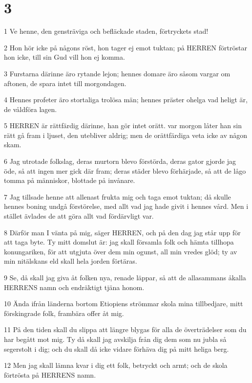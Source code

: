 \chapter{3}

\par 1 Ve henne, den gensträviga och befläckade staden, förtryckets stad!
\par 2 Hon hör icke på någons röst, hon tager ej emot tuktan; på HERREN förtröstar hon icke, till sin Gud vill hon ej komma.
\par 3 Furstarna därinne äro rytande lejon; hennes domare äro såsom vargar om aftonen, de spara intet till morgondagen.
\par 4 Hennes profeter äro stortaliga trolösa män; hennes präster ohelga vad heligt är, de våldföra lagen.
\par 5 HERREN är rättfärdig därinne, han gör intet orätt. var morgon låter han sin rätt gå fram i ljuset, den utebliver aldrig; men de orättfärdiga veta icke av någon skam.
\par 6 Jag utrotade folkslag, deras murtorn blevo förstörda, deras gator gjorde jag öde, så att ingen mer gick där fram; deras städer blevo förhärjade, så att de lågo tomma på människor, blottade på invånare.
\par 7 Jag tillsade henne att allenast frukta mig och taga emot tuktan; då skulle hennes boning undgå förstörelse, med allt vad jag hade givit i hennes vård. Men i stället ävlades de att göra allt vad fördärvligt var.
\par 8 Därför man I vänta på mig, säger HERREN, och på den dag jag står upp för att taga byte. Ty mitt domslut är: jag skall församla folk och hämta tillhopa konungariken, för att utgjuta över dem min ogunst, all min vredes glöd; ty av min nitälskans eld skall hela jorden förtäras.
\par 9 Se, då skall jag giva åt folken nya, renade läppar, så att de allasammans åkalla HERRENS namn och endräktigt tjäna honom.
\par 10 Ända ifrån länderna bortom Etiopiens strömmar skola mina tillbedjare, mitt förskingrade folk, frambära offer åt mig.
\par 11 På den tiden skall du slippa att längre blygas för alla de överträdelser som du har begått mot mig. Ty då skall jag avskilja från dig dem som nu jubla så segerstolt i dig; och du skall då icke vidare förhäva dig på mitt heliga berg.
\par 12 Men jag skall lämna kvar i dig ett folk, betryckt och armt; och de skola förtrösta på HERRENS namn.
